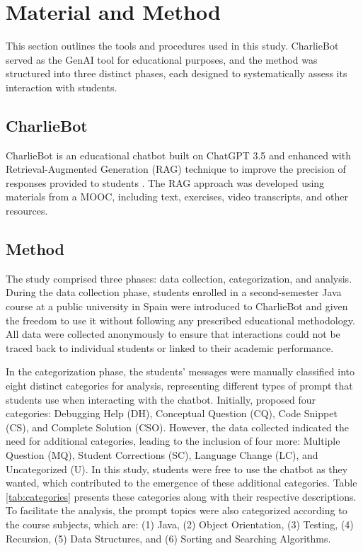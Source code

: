 \documentclass[runningheads]{llncs}
\begin{document}
\section{Material and Method}

This section outlines the tools and procedures used in this study. CharlieBot
served as the GenAI tool for educational purposes, and the method was structured
into three distinct phases, each designed to systematically assess its
interaction with students.

\subsection{CharlieBot}

CharlieBot is an educational chatbot built on ChatGPT 3.5 and enhanced with
Retrieval-Augmented Generation (RAG) technique to improve the precision of
responses provided to students \cite{Sun24}. The RAG approach was developed
using materials from a MOOC, including text, exercises, video transcripts, and
other resources.

\subsection{Method}

The study comprised three phases: data collection, categorization, and analysis.
During the data collection phase, students enrolled in a second-semester Java
course at a public university in Spain were introduced to CharlieBot and given
the freedom to use it without following any prescribed educational methodology.
All data were collected anonymously to ensure that interactions could not be
traced back to individual students or linked to their academic performance.

In the categorization phase, the students' messages were manually classified
into eight distinct categories for analysis, representing different types of
prompt that students use when interacting with the chatbot. Initially,
\cite{Ghimire24} proposed four categories: Debugging Help (DH), Conceptual
Question (CQ), Code Snippet (CS), and Complete Solution (CSO). However, the data
collected indicated the need for additional categories, leading to the inclusion
of four more: Multiple Question (MQ), Student Corrections (SC), Language Change
(LC), and Uncategorized (U). In this study, students were free to use the
chatbot as they wanted, which contributed to the emergence of these additional
categories. Table \ref{tab:categories} presents these categories along with
their respective descriptions. To facilitate the analysis, the prompt topics
were also categorized according to the course subjects, which are: (1) Java, (2)
Object Orientation, (3) Testing, (4) Recursion, (5) Data Structures, and (6)
Sorting and Searching Algorithms.
\end{document}
